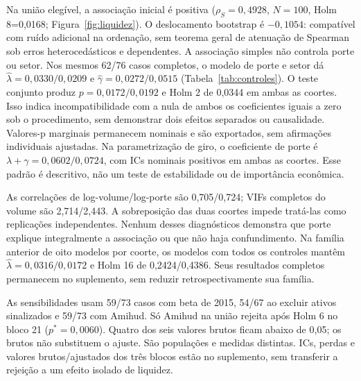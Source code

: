 Na união elegível, a associação inicial é positiva
($\rho_S=0,4928$, $N=100$, Holm 8=0,0168; Figura~\ref{fig:liquidez}).
O deslocamento bootstrap é $-0,1054$: compatível com ruído adicional
na ordenação, sem teorema geral de atenuação de Spearman sob erros
heterocedásticos e dependentes. A associação simples não controla porte
ou setor. Nos mesmos 62/76 casos completos, o modelo de porte e setor dá
$\widehat\lambda=0,0330/0,0209$ e $\widehat\gamma=0,0272/0,0515$
(Tabela~\ref{tab:controles}). O teste conjunto produz $p=0,0172/0,0192$
e Holm 2 de 0,0344 em ambas as coortes. Isso indica incompatibilidade
com a nula de ambos os coeficientes iguais a zero sob o procedimento,
sem demonstrar dois efeitos separados ou causalidade. Valores-p marginais permanecem nominais e são exportados, sem afirmações individuais ajustadas. Na parametrização de giro, o coeficiente de porte é
$\lambda+\gamma=0,0602/0,0724$, com ICs nominais positivos em ambas
as coortes. Esse padrão é descritivo, não um teste de estabilidade ou de importância econômica.

As correlações de log-volume/log-porte são 0,705/0,724; VIFs completos
do volume são 2,714/2,443. A sobreposição das duas coortes impede tratá-las
como replicações independentes. Nenhum desses diagnósticos demonstra
que porte explique integralmente a associação ou que não haja confundimento.
Na família anterior de oito modelos por coorte, os modelos com todos
os controles mantêm $\widehat\lambda=0,0316/0,0172$ e Holm 16 de
0,2424/0,4386. Seus resultados completos permanecem no suplemento,
sem reduzir retrospectivamente sua família.

\begin{table}[!htbp]\centering\small
\caption{Modelo exploratório de porte e setor, bloco 21. ICs marginais
básicos nominais; $p^*$ testa conjuntamente volume e porte, com Holm 2.
Rejeição conjunta não identifica qual coeficiente difere de zero.}
\label{tab:controles}\resizebox{\textwidth}{!}{}
\end{table}

As sensibilidades usam 59/73 casos com beta de 2015, 54/67 ao excluir
ativos sinalizados e 59/73 com Amihud. Só Amihud na união rejeita após
Holm 6 no bloco 21 ($p^*=0,0060$). Quatro dos seis valores brutos ficam
abaixo de 0,05; os brutos não substituem o ajuste. São populações e medidas
distintas. ICs, perdas e valores brutos/ajustados dos três blocos estão
no suplemento, sem transferir a rejeição a um efeito isolado de liquidez.

